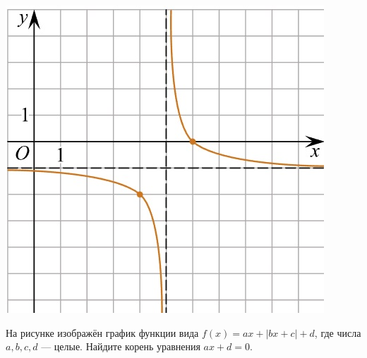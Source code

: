 \begin{class}[number=5]
\begin{listofex}
\begin{minipage}[c]{0.25\textwidth}
			\includegraphics[align=t, width=\textwidth]{pics/G101M4C5-5.jpg}
		\end{minipage}
		\item
		\begin{minipage}[t]{0.76\textwidth}
			На рисунке изображён график функции вида \(f(x)=ax+|bx+c|+d\), где числа \(a, b, c, d\) --- целые. Найдите корень уравнения \(ax+d=0\).
		\end{minipage}
		\begin{minipage}[c]{0.17\textwidth}

\end{minipage}
\end{listofex}
\end{class}
